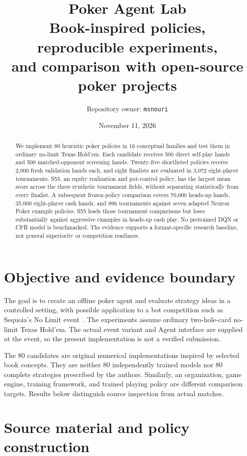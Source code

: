\documentclass[11pt,letterpaper]{article}
\title{\textbf{Poker Agent Lab}\\[5pt]\large Book-inspired policies, reproducible experiments,\\and comparison with open-source poker projects}
\author{Repository owner: \texttt{msnouri}}
\date{November 11, 2026}
\begin{document}
\maketitle
\begin{abstract}
We implement 80 heuristic poker policies in 16 conceptual families and test
them in ordinary no-limit Texas Hold'em. Each candidate receives 500 direct
self-play hands and 500 matched-opponent screening hands. Twenty-five
shortlisted policies receive 2,000 fresh validation hands each, and eight
finalists are evaluated in 3,072 eight-player tournaments. S55, an equity
realization and pot-control policy, has the largest mean score across the
three synthetic tournament fields, without separating statistically from
every finalist. A subsequent frozen-policy comparison covers 70,000 heads-up
hands, 35,000 eight-player cash hands, and 896 tournaments against seven
adapted Neuron Poker example policies. S55 leads those tournament
comparisons but loses substantially against aggressive examples in heads-up
cash play. No pretrained DQN or CFR model is benchmarked. The evidence
supports a format-specific research baseline, not general superiority or
competition readiness.
\end{abstract}

\section{Objective and evidence boundary}
The goal is to create an offline poker agent and evaluate strategy ideas in a
controlled setting, with possible application to a bot competition such as
Sequoia's No Limit event~\cite{competition}. The experiments assume ordinary
two-hole-card no-limit Texas Hold'em. The actual event variant and Agent
interface are supplied at the event, so the present implementation is not a
verified submission.

The 80 candidates are original numerical implementations inspired by selected
book concepts. They are neither 80 independently trained models nor 80
complete strategies prescribed by the authors. Similarly, an organization,
game engine, training framework, and trained playing policy are different
comparison targets. Results below distinguish source inspection from actual
matches.

\section{Source material and policy construction}
\end{document}
